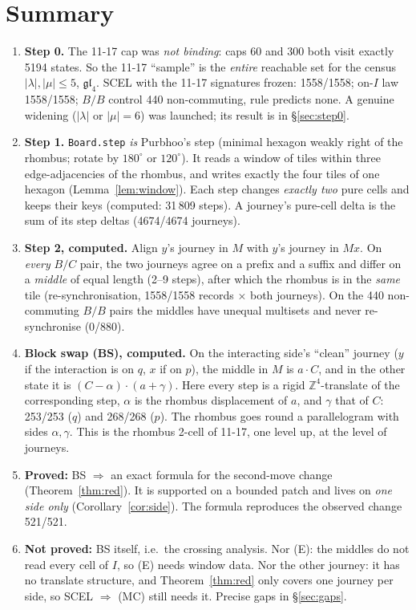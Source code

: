 \documentclass[11pt]{article}
\theoremstyle{definition}\newtheorem{definition}[theorem]{Definition}\newtheorem{remark}[theorem]{Remark}
\begin{document}
\section*{Summary}
\begin{enumerate}
\item \textbf{Step 0.} The 11-17 cap was \emph{not binding}: caps 60 and 300 both visit exactly 5194 states. So the 11-17 ``sample'' is the \emph{entire} reachable set for the census
$|\lambda|,|\mu|\le5$, $\mathfrak{gl}_4$. SCEL with the 11-17 signatures frozen: 1558/1558; on-$I$ law 1558/1558; $B/B$ control 440 non-commuting, rule predicts none.
A genuine widening ($|\lambda|$ or $|\mu|=6$) was launched; its result is in \S\ref{sec:step0}.
\item \textbf{Step 1.} \texttt{Board.step} \emph{is} Purbhoo's step (minimal hexagon weakly right of the rhombus; rotate by $180^\circ$ or $120^\circ$). It reads a window of tiles within
three edge-adjacencies of the rhombus, and writes exactly the four tiles of one hexagon (Lemma~\ref{lem:window}). Each step changes \emph{exactly two} pure cells and keeps
their keys (computed: 31\,809 steps). A journey's pure-cell delta is the sum of its step deltas (4674/4674 journeys).
\item \textbf{Step 2, computed.} Align $y$'s journey in $M$ with $y$'s journey in $Mx$. On \emph{every} $B/C$ pair, the two journeys agree on a prefix and a suffix and differ on a
\emph{middle} of equal length (2--9 steps), after which the rhombus is in the \emph{same} tile (re-synchronisation, 1558/1558 records $\times$ both journeys).
On the 440 non-commuting $B/B$ pairs the middles have unequal multisets and never re-synchronise (0/880).
\item \textbf{Block swap (BS), computed.} On the interacting side's ``clean'' journey ($y$ if the interaction is on $q$, $x$ if on $p$), the middle in $M$ is $a\cdot C$, and in the other
state it is $(C-\alpha)\cdot(a+\gamma)$. Here every step is a rigid $\mathbb Z^4$-translate of the corresponding step, $\alpha$ is the rhombus displacement of $a$, and $\gamma$ that of $C$:
253/253 ($q$) and 268/268 ($p$). The rhombus goes round a parallelogram with sides $\alpha,\gamma$. This is the rhombus 2-cell of 11-17, one level up, at the level of journeys.
\item \textbf{Proved:} BS $\Rightarrow$ an exact formula for the second-move change (Theorem~\ref{thm:red}). It is supported on a bounded patch and lives on \emph{one side only}
(Corollary~\ref{cor:side}). The formula reproduces the observed change 521/521.
\item \textbf{Not proved:} BS itself, i.e.\ the crossing analysis. Nor (E): the middles do not read every cell of $I$, so (E) needs window data. Nor the other journey: it has no translate
structure, and Theorem~\ref{thm:red} only covers one journey per side, so SCEL $\Rightarrow$ (MC) still needs it. Precise gaps in \S\ref{sec:gaps}.
\end{enumerate}
\end{document}
